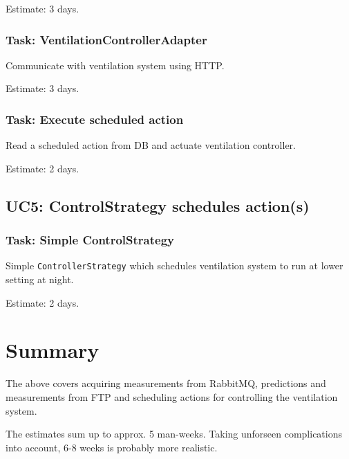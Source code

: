 Estimate: 3 days.

\subsubsection{Task: VentilationControllerAdapter}
Communicate with ventilation system using HTTP.

Estimate: 3 days.

\subsubsection{Task: Execute scheduled action}
Read a scheduled action from DB and actuate ventilation controller.

Estimate: 2 days.

\subsection*{UC5: ControlStrategy schedules action(s)}
\subsubsection{Task: Simple ControlStrategy}
Simple \texttt{ControllerStrategy} which schedules ventilation system to run at lower setting at night.

Estimate: 2 days.


\section{Summary}
The above covers acquiring measurements from RabbitMQ, predictions and measurements from FTP and scheduling actions for controlling the ventilation system.

The estimates sum up to approx. 5 man-weeks. Taking unforseen complications into account, 6-8 weeks is probably more realistic. 
